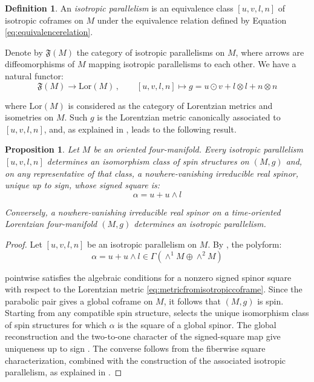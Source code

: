 \documentclass[10pt,reqno,a4paper]{amsart}
\theoremstyle{plain}
\newtheorem{prop}[thm]{Proposition}
\theoremstyle{definition}
\newtheorem{definition}[thm]{Definition}
\theoremstyle{remark}
\theoremstyle{remark}
\renewcommand{\(}{ (}
\renewcommand{\)}{ )}
\begin{document}
\begin{definition}
An \emph{isotropic parallelism} is an equivalence class $[u,v,l,n]$ of isotropic coframes on $M$ under the equivalence relation defined by Equation \eqref{eq:equivalencerelation}.
\end{definition}  
 
\noindent
Denote by $\mathfrak{F}(M)$ the category of isotropic parallelisms on $M$, where arrows are diffeomorphisms of $M$ mapping isotropic parallelisms to each other. We have a natural functor:
\begin{equation*}
\mathfrak{F}(M) \to \mathrm{Lor}(M)\, , \qquad [u,v,l,n] \mapsto g = u\odot v + l\otimes l + n\otimes n
\end{equation*}

\noindent
where $\mathrm{Lor}(M)$ is considered as the category of Lorentzian metrics and isometries on $M$. Such $g$ is the Lorentzian metric canonically associated to $[u,v,l,n]$, and, as explained in \cite{ShahbaziTesis}, leads to the following result.

\begin{prop}
\label{prop:global-spinor-parabolic}
Let $M$ be an oriented four-manifold.  Every isotropic parallelism $[u,v,l,n]$ determines an isomorphism class of spin structures on $(M,g)$ and, on any representative of that class, a nowhere-vanishing irreducible real spinor, unique up to sign, whose signed square is:
\begin{equation*}
\alpha = u + u\wedge l    
\end{equation*}

\noindent
Conversely, a nowhere-vanishing irreducible real spinor on a time-oriented Lorentzian four-manifold $(M,g)$ determines an isotropic parallelism.   
\end{prop}

\begin{proof}
Let $[u,v,l,n]$ be an isotropic parallelism on $M$. By \cite[Theorem~3.34]{Cortes:2019xmk}, the polyform: 
\begin{equation*}
\alpha=u+u\wedge l \in \Gamma (\wedge^1 M \oplus \wedge^2 M)    
\end{equation*}

\noindent
pointwise satisfies the algebraic conditions for a nonzero signed spinor square with respect to the Lorentzian metric \eqref{eq:metricfromisotropiccoframe}. Since the parabolic pair gives a global coframe on $M$, it follows that $(M,g)$ is spin. Starting from any compatible spin structure, \cite[Proposition~4.22]{Cortes:2019xmk} selects the unique isomorphism class of spin structures for which $\alpha$ is the square of a global spinor.  The global reconstruction and the two-to-one character of the signed-square map give uniqueness up to sign \cite[Section~4.4 and Proposition~4.18]{Cortes:2019xmk}. The converse follows from the fiberwise square characterization, combined with the construction of the associated isotropic parallelism, as explained in \cite{ShahbaziTesis}.
\end{proof}
\end{document}
